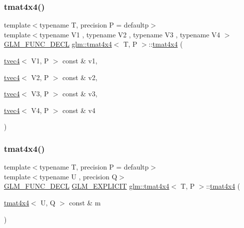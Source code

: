 \subsubsection{\texorpdfstring{tmat4x4()}{tmat4x4()}\hspace{0.1cm}{\footnotesize\ttfamily [9/22]}}
{\footnotesize\ttfamily template$<$typename T, precision P = defaultp$>$ \\
template$<$typename V1 , typename V2 , typename V3 , typename V4 $>$ \\
\mbox{\hyperlink{setup_8hpp_ab2d052de21a70539923e9bcbf6e83a51}{G\+L\+M\+\_\+\+F\+U\+N\+C\+\_\+\+D\+E\+CL}} \mbox{\hyperlink{structglm_1_1tmat4x4}{glm\+::tmat4x4}}$<$ T, P $>$\+::\mbox{\hyperlink{structglm_1_1tmat4x4}{tmat4x4}} (\begin{DoxyParamCaption}\item[{\mbox{\hyperlink{structglm_1_1tvec4}{tvec4}}$<$ V1, P $>$ const \&}]{v1,  }\item[{\mbox{\hyperlink{structglm_1_1tvec4}{tvec4}}$<$ V2, P $>$ const \&}]{v2,  }\item[{\mbox{\hyperlink{structglm_1_1tvec4}{tvec4}}$<$ V3, P $>$ const \&}]{v3,  }\item[{\mbox{\hyperlink{structglm_1_1tvec4}{tvec4}}$<$ V4, P $>$ const \&}]{v4 }\end{DoxyParamCaption})}

\mbox{\label{structglm_1_1tmat4x4_ab23da6e5a57ab5834de4be100480b406}} 
\subsubsection{\texorpdfstring{tmat4x4()}{tmat4x4()}\hspace{0.1cm}{\footnotesize\ttfamily [10/22]}}
{\footnotesize\ttfamily template$<$typename T, precision P = defaultp$>$ \\
template$<$typename U , precision Q$>$ \\
\mbox{\hyperlink{setup_8hpp_ab2d052de21a70539923e9bcbf6e83a51}{G\+L\+M\+\_\+\+F\+U\+N\+C\+\_\+\+D\+E\+CL}} \mbox{\hyperlink{setup_8hpp_a6c74f5a5e7b134ab69023ff9a30d4d5d}{G\+L\+M\+\_\+\+E\+X\+P\+L\+I\+C\+IT}} \mbox{\hyperlink{structglm_1_1tmat4x4}{glm\+::tmat4x4}}$<$ T, P $>$\+::\mbox{\hyperlink{structglm_1_1tmat4x4}{tmat4x4}} (\begin{DoxyParamCaption}\item[{\mbox{\hyperlink{structglm_1_1tmat4x4}{tmat4x4}}$<$ U, Q $>$ const \&}]{m }\end{DoxyParamCaption})}

